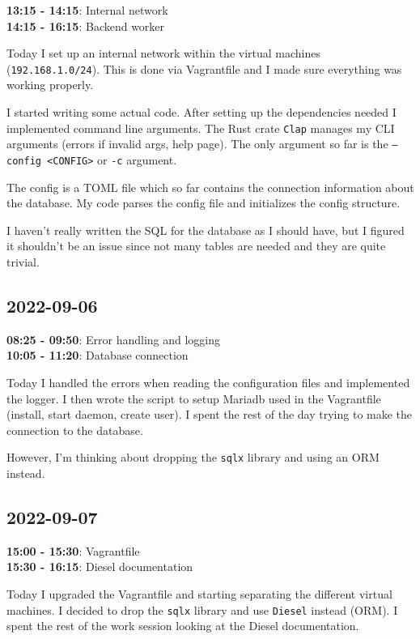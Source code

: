 \documentclass{article}
\begin{document}
\textbf{13:15 - 14:15}: Internal network \\
\textbf{14:15 - 16:15}: Backend worker

Today I set up an internal network within the virtual machines (\texttt{192.168.1.0/24}).
This is done via Vagrantfile and I made sure everything was working properly.

I started writing some actual code.
After setting up the dependencies needed I implemented command line arguments.
The Rust crate \texttt{Clap} manages my CLI arguments (errors if invalid args, help page).
The only argument so far is the \texttt{--config <CONFIG>} or \texttt{-c} argument.

The config is a TOML file which so far contains the connection information about the database.
My code parses the config file and initializes the config structure.

I haven't really written the SQL for the database as I should have, but I figured
it shouldn't be an issue since not many tables are needed and they are quite trivial.

\subsection{2022-09-06}

\textbf{08:25 - 09:50}: Error handling and logging \\
\textbf{10:05 - 11:20}: Database connection

Today I handled the errors when reading the configuration files and implemented
the logger. I then wrote the script to setup Mariadb used in the Vagrantfile (install, start daemon, create user).
I spent the rest of the day trying to make the connection to the database.

However, I'm thinking about dropping the \texttt{sqlx} library and using an ORM instead.

\subsection{2022-09-07}

\textbf{15:00 - 15:30}: Vagrantfile \\
\textbf{15:30 - 16:15}: Diesel documentation

Today I upgraded the Vagrantfile and starting separating the
different virtual machines. I decided to drop the \texttt{sqlx}
library and use \texttt{Diesel} instead (ORM). I spent the rest of the work session
looking at the Diesel documentation.
\end{document}
